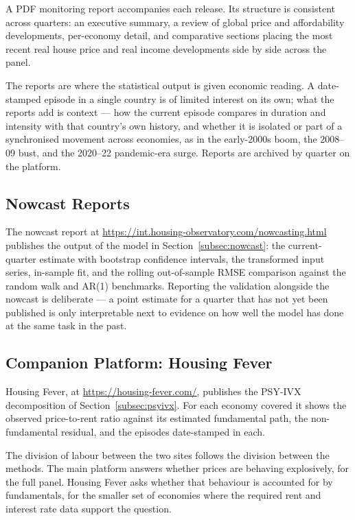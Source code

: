 A PDF monitoring report accompanies each release. Its structure is
consistent across quarters: an executive summary, a review of global price
and affordability developments, per-economy detail, and comparative sections
placing the most recent real house price and real income developments side by
side across the panel.

The reports are where the statistical output is given economic reading. A
date-stamped episode in a single country is of limited interest on its own;
what the reports add is context --- how the current episode compares in
duration and intensity with that country's own history, and whether it is
isolated or part of a synchronised movement across economies, as in the
early-2000s boom, the 2008--09 bust, and the 2020--22 pandemic-era surge.
Reports are archived by quarter on the platform.

\subsection{Nowcast Reports}

The nowcast report at
\url{https://int.housing-observatory.com/nowcasting.html} publishes the
output of the model in Section~\ref{subsec:nowcast}: the current-quarter
estimate with bootstrap confidence intervals, the transformed input series,
in-sample fit, and the rolling out-of-sample RMSE comparison against the
random walk and AR(1) benchmarks. Reporting the validation alongside the
nowcast is deliberate --- a point estimate for a quarter that has not yet
been published is only interpretable next to evidence on how well the model
has done at the same task in the past.

\subsection{Companion Platform: Housing Fever}

Housing Fever, at \url{https://housing-fever.com/}, publishes the PSY-IVX
decomposition of Section~\ref{subsec:psyivx}. For each economy covered it
shows the observed price-to-rent ratio against its estimated fundamental
path, the non-fundamental residual, and the episodes date-stamped in each.

The division of labour between the two sites follows the division between
the methods. The main platform answers whether prices are behaving
explosively, for the full panel. Housing Fever asks whether that behaviour is
accounted for by fundamentals, for the smaller set of economies where the
required rent and interest rate data support the question.

